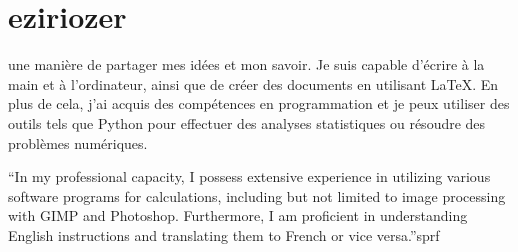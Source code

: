 \documentclass{article}
\begin{document}
\section{eziriozer}

une manière de partager mes idées et mon savoir. Je suis capable d'écrire à la main et à l'ordinateur, ainsi que de créer des documents en utilisant LaTeX. En plus de cela, j'ai acquis des compétences en programmation et je peux utiliser des outils tels que Python pour effectuer des analyses statistiques ou résoudre des problèmes numériques.


 ``In my professional capacity, I possess extensive experience in utilizing various software programs for calculations, including but not limited to image processing with GIMP and Photoshop. Furthermore, I am proficient in understanding English instructions and translating them to French or vice versa.''sprf
\end{document}
